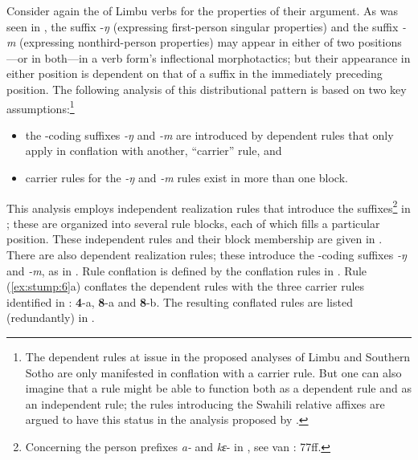 \documentclass[output=paper,
modfonts
]{LSP/langsci}
\begin{document}
Consider again the  of Limbu verbs for the properties of their  argument.  As was seen in , the suffix \nobreakdash-\textit{ŋ} (expressing first\nobreakdash-person singular  properties) and the suffix \textit{\nobreakdash-m} (expressing nonthird\nobreakdash-person   properties) may appear in either of two positions—or in both—in a verb form’s inflectional morphotactics; but their appearance in either position is dependent on that of a suffix in the immediately preceding position.  The following analysis of this distributional pattern is based on two key assumptions:\footnote{ The dependent rules at issue in the proposed analyses of Limbu and Southern Sotho are only manifested in conflation with a carrier rule.  But one can also imagine that a rule might be able to function both as a dependent rule and as an independent rule; the rules introducing the Swahili relative affixes are argued to have this status in the analysis proposed by \citet{stump}.}

\begin{itemize}
\item 
the \nobreakdash-coding suffixes \textit{\nobreakdash-ŋ} and \textit{\nobreakdash-m} are introduced by dependent rules that only apply in conflation with another, “carrier” rule, and
\item 
carrier rules for the \textit{\nobreakdash-ŋ} and \textit{\nobreakdash-m} rules exist in more than one block.  
\end{itemize}

This analysis employs independent realization rules that introduce the suffixes\footnote{Concerning the person prefixes \textit{a\nobreakdash-} and \textit{kε}\nobreakdash- in , see van \citealt{Driem1987}: 77ff.} in ; these are organized into several rule blocks, each of which fills a particular  position.  These independent rules and their block membership are given in .  There are also dependent realization rules; these introduce the \nobreakdash-coding suffixes \textit{\nobreakdash-ŋ} and \textit{\nobreakdash-m}, as in .  Rule conflation is defined by the conflation rules in .  Rule (\ref{ex:stump:6}a) conflates the dependent rules with the three carrier rules identified in :  \textbf{4}\nobreakdash-a, \textbf{8}\nobreakdash-a and \textbf{8}\nobreakdash-b.  The resulting conflated rules are listed (redundantly) in .  
\end{document}
